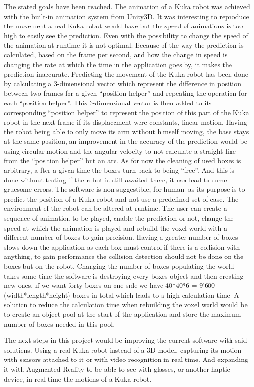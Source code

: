 \documentclass{scrartcl}
\begin{document}
The stated goals have been reached. The animation of a Kuka robot was achieved with the built-in animation system from Unity3D. 
It was interesting to reproduce the movement a real Kuka robot would have but the speed of animations is too high to easily see the prediction. 
Even with the possibility to change the speed of the animation at runtime it is not optimal. Because of the way the prediction is calculated, 
based on the frame per second, and how the change in speed is changing the rate at which the time in the application goes by, it makes the prediction inaccurate. 
Predicting the movement of the Kuka robot has been done by calculating a 3-dimensional vector which represent the difference in position between two frames 
for a given “position helper” and repeating the operation for each “position helper”. 
This 3-dimensional vector is then added to its corresponding “position helper” to represent the position of this part of the Kuka robot 
in the next frame if its displacement were constants, linear motion. Having the robot being able to only move its arm without himself moving, 
the base stays at the same position, an improvement in the accuracy of the prediction would be using circular motion 
and the angular velocity to not calculate a straight line from the “position helper” but an arc. As for now the cleaning of used boxes is arbitrary, a
fter a given time the boxes turn back to being “free”. And this is done without testing if the robot is still awaited there, it can lead to some gruesome errors. 
The software is non-suggestible, for human, as its purpose is to predict the position of a Kuka robot and not use a predefined set of case. 
The environment of the robot can be altered at runtime. The user can create a sequence of animation to be played, enable the prediction or not, 
change the speed at which the animation is played and rebuild the voxel world with a different number of boxes to gain precision. 
Having a greater number of boxes slows down the application as each box must control if there is a collision with anything, 
to gain performance the collision detection should not be done on the boxes but on the robot. 
Changing the number of boxes populating the world takes some time the software is destroying every boxes object and then creating new ones, 
if we want forty boxes on one side we have 40*40*6 = 9’600 (width*length*height) boxes in total which leads to a high calculation time. 
A solution to reduce the calculation time when rebuilding the voxel world would be to create an object pool at the start of the application and store the maximum number of boxes needed in this pool.

The next steps in this project would be improving the current software with said solutions. Using a real Kuka robot instead of a 3D model, capturing its motion with sensors attached to it or with video recognition in real time. And expanding it with Augmented Reality to be able to see with glasses, or another haptic device, in real time the motions of a Kuka robot.


\printbibliography[heading=bibintoc]
\end{document}
